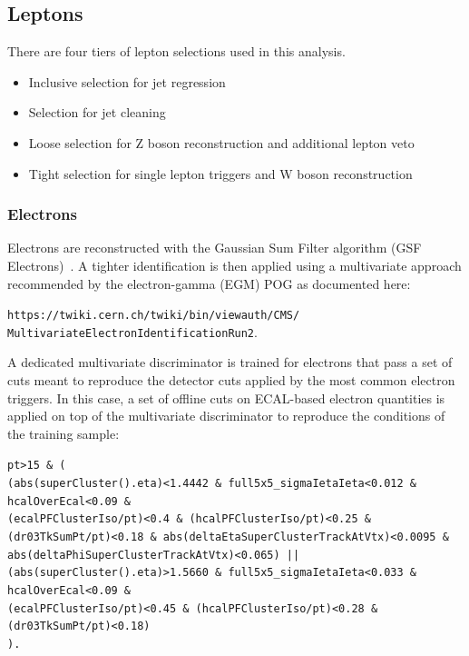 
\subsection{Leptons}
There are four tiers of lepton selections used in this analysis.
\begin{itemize}
  \item Inclusive selection for jet regression 
  \item Selection for jet cleaning
  \item Loose selection for Z boson reconstruction and additional lepton veto
  \item Tight selection for single lepton triggers and W boson reconstruction
\end{itemize}
\subsubsection{Electrons}
  Electrons are reconstructed with the Gaussian Sum Filter
  algorithm (GSF Electrons)~\cite{Khachatryan:2015hwa}. A tighter identification is then applied using a multivariate approach
  recommended by the electron-gamma (EGM) POG as documented here:

  \small{\texttt{https://twiki.cern.ch/twiki/bin/viewauth/CMS/ \\
  MultivariateElectronIdentificationRun2}}.
 
  A dedicated multivariate discriminator is trained for electrons that pass a set of cuts meant to reproduce
  the detector cuts applied by the most common electron triggers. 
  In this case, a set of offline cuts on ECAL-based electron quantities is applied
  on top of the multivariate discriminator to reproduce the conditions of the training sample:

  \texttt{pt>15 \& (}\\
  \texttt{(abs(superCluster().eta)<1.4442 \& full5x5\_sigmaIetaIeta<0.012 \& }\\
  \texttt{hcalOverEcal<0.09 \&}\\
  \texttt{(ecalPFClusterIso/pt)<0.4 \& (hcalPFClusterIso/pt)<0.25 \&}\\
  \texttt{(dr03TkSumPt/pt)<0.18 \& abs(deltaEtaSuperClusterTrackAtVtx)<0.0095 \&}\\
  \texttt{abs(deltaPhiSuperClusterTrackAtVtx)<0.065) || }\\
  \texttt{(abs(superCluster().eta)>1.5660 \& full5x5\_sigmaIetaIeta<0.033 \&}\\
  \texttt{hcalOverEcal<0.09 \&}\\
  \texttt{(ecalPFClusterIso/pt)<0.45 \& (hcalPFClusterIso/pt)<0.28 \&}\\
  \texttt{(dr03TkSumPt/pt)<0.18)}\\
  \texttt{).}

